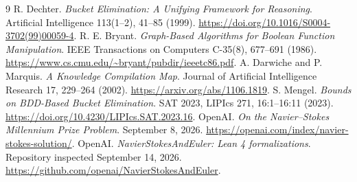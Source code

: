 \documentclass[11pt]{article}
\begin{document}
\begin{thebibliography}{9}
R. Dechter. \emph{Bucket Elimination: A Unifying Framework for Reasoning}.
Artificial Intelligence 113(1--2), 41--85 (1999).
\url{https://doi.org/10.1016/S0004-3702(99)00059-4}.
R. E. Bryant. \emph{Graph-Based Algorithms for Boolean Function Manipulation}.
IEEE Transactions on Computers C-35(8), 677--691 (1986).
\url{https://www.cs.cmu.edu/~bryant/pubdir/ieeetc86.pdf}.
A. Darwiche and P. Marquis. \emph{A Knowledge Compilation Map}.
Journal of Artificial Intelligence Research 17, 229--264 (2002).
\url{https://arxiv.org/abs/1106.1819}.
S. Mengel. \emph{Bounds on BDD-Based Bucket Elimination}.
SAT 2023, LIPIcs 271, 16:1--16:11 (2023).
\url{https://doi.org/10.4230/LIPIcs.SAT.2023.16}.
OpenAI. \emph{On the Navier--Stokes Millennium Prize Problem}.
September 8, 2026.
\url{https://openai.com/index/navier-stokes-solution/}.
OpenAI. \emph{NavierStokesAndEuler: Lean 4 formalizations}.
Repository inspected September 14, 2026.
\url{https://github.com/openai/NavierStokesAndEuler}.
\end{thebibliography}
\end{document}
